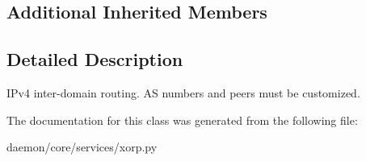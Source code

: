 \subsection*{Additional Inherited Members}


\subsection{Detailed Description}
\begin{DoxyVerb}IPv4 inter-domain routing. AS numbers and peers must be customized.
\end{DoxyVerb}
 

The documentation for this class was generated from the following file\+:\begin{DoxyCompactItemize}
\item 
daemon/core/services/xorp.\+py\end{DoxyCompactItemize}
